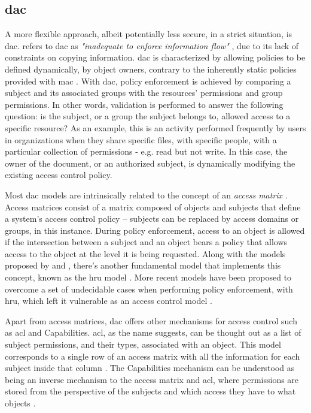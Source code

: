 \subsection{\glsdesc{dac}}
\label{sec:models-dac}

A more flexible approach, albeit potentially less secure, in a strict situation, is \glsdesc{dac}. \citeauthor{sandhu_lattice-based_1993} refers to \gls{dac} as \emph{"inadequate to enforce information flow"} \cite[8]{sandhu_lattice-based_1993}, due to its lack of constraints on copying information. \gls{dac} is characterized by allowing policies to be defined dynamically, by object owners, contrary to the inherently static policies provided with \gls{mac} \cite[23]{biba_integrity_1977}. With \gls{dac}, policy enforcement is achieved by comparing a subject and its associated groups with the resources’ permissions and group permissions. In other words, validation is performed to answer the following question: is the subject, or a group the subject belongs to, allowed access to a specific resource? As an example, this is an activity performed frequently by users in organizations when they share specific files, with specific people, with a particular collection of permissions - e.g. read but not write. In this case, the owner of the document, or an authorized subject, is dynamically modifying the existing access control policy.

Most \gls{dac} models are intrinsically related to the concept of an \emph{access matrix} \cite{graham_protection:_1972, lampson_protection_1974}. Access matrices consist of a matrix composed of objects and subjects that define a system’s access control policy – subjects can be replaced by access domains or groups, in this instance. During policy enforcement, access to an object is allowed if the intersection between a subject and an object bears a policy that allows access to the object at the level it is being requested. Along with the models proposed by \citeauthor{graham_protection:_1972} \cite{graham_protection:_1972} and \citeauthor{lampson_protection_1974} \cite{lampson_protection_1974}, there's another fundamental model that implements this concept, known as the \gls{hru} model \cite{harrison_protection_1976}. More recent models have been proposed to overcome a set of undecidable cases when performing policy enforcement, with \gls{hru}, which left it vulnerable as an access control model \cite{sandhu_schematic_1988, sandhu_typed_1992}.

Apart from access matrices, \gls{dac} offers other mechanisms for access control such as \gls{acl} and Capabilities. \gls{acl}, as the name suggests, can be thought out as a list of subject permissions, and their types, associated with an object. This model corresponds to a single row of an access matrix with all the information for each subject inside that column \cite{sandhu1994access}. The Capabilities mechanism can be understood as being an inverse mechanism to the access matrix and \gls{acl}, where permissions are stored from the perspective of the subjects and which access they have to what objects \cite{sandhu1994access}.

